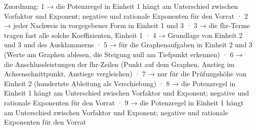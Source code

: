 
Zuordnung: 1 → die Potenzregel in Einheit 1 hängt am Unterschied zwischen Vorfaktor und Exponent; negative und rationale Exponenten für den Vorrat · 2 → jeder Nachweis in vorgegebener Form in Einheit 1 und 3 · 3 → die fhr-Terme tragen fast alle solche Koeffizienten, Einheit 1 · 4 → Grundlage von Einheit 2 und 3 und des Ausklammerns · 5 → für die Graphenaufgaben in Einheit 2 und 3 (Werte am Graphen ablesen, die Steigung null am Tiefpunkt erkennen) · 6 → die Anschlussleistungen der fhr-Zeilen (Punkt auf dem Graphen, Anstieg im Achsenschnittpunkt, Anstiege vergleichen) · 7 → nur für die Prüfungshöhe von Einheit 2 (hundertste Ableitung als Verschiebung) · 8 → die Potenzregel in Einheit 1 hängt am Unterschied zwischen Vorfaktor und Exponent; negative und rationale Exponenten für den Vorrat · 9 → die Potenzregel in Einheit 1 hängt am Unterschied zwischen Vorfaktor und Exponent; negative und rationale Exponenten für den Vorrat

